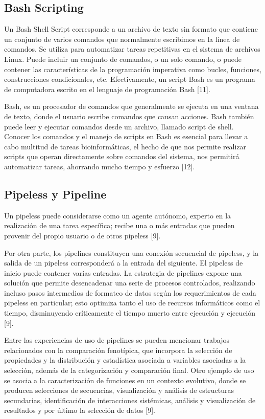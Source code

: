 \documentclass[12pt]{article}
\begin{document}
\subsection*{Bash Scripting}

Un Bash Shell Script corresponde a un archivo de texto sin formato que 
contiene un conjunto de varios comandos que normalmente escribimos en la 
línea de comandos. Se utiliza para automatizar tareas repetitivas en el 
sistema de archivos Linux. Puede incluir un conjunto de comandos, o un solo 
comando, o puede contener las características de la programación imperativa como 
bucles, funciones, construcciones condicionales, etc. Efectivamente, un script 
Bash es un programa de computadora escrito en el lenguaje de programación Bash [11].

Bash, es un procesador de comandos que generalmente se ejecuta en una ventana de 
texto, donde el usuario escribe comandos que causan acciones. Bash también puede 
leer y ejecutar comandos desde un archivo, llamado script de shell.  Conocer los 
comandos y el manejo de scripts en Bash es esencial para llevar a cabo multitud de 
tareas bioinformáticas, el hecho de que nos permite realizar scripts que operan 
directamente sobre comandos del sistema, nos permitirá automatizar tareas, ahorrando 
mucho tiempo y esfuerzo [12].

\subsection*{Pipeless y Pipeline}

Un pipeless puede considerarse como un agente autónomo, experto en la 
realización de una tarea específica; recibe una o más entradas que pueden 
provenir del propio usuario o de otros pipeless [9].

Por otra parte, los pipelines constituyen una conexión secuencial de 
pipeless, y  la salida de un pipeless corresponderá a la entrada del siguiente. 
El pipeless de inicio puede contener varias entradas. La estrategia de pipelines 
expone una solución que permite desencadenar una serie de procesos controlados, 
realizando incluso pasos intermedios de formateo de datos según los requerimientos 
de cada pipeless en particular; esto optimiza tanto el uso de recursos informáticos 
como el tiempo, disminuyendo críticamente el tiempo muerto entre 
ejecución y ejecución [9].

Entre las experiencias de uso de pipelines se pueden mencionar trabajos 
relacionados con la comparación fenotípica, que incorpora la selección de propiedades 
y la distribución y estadística asociada a variables asociadas a la selección, además 
de la categorización y comparación final. Otro ejemplo de uso se asocia a la 
caracterización de funciones en un contexto evolutivo, donde se producen selecciones 
de secuencias, visualización y análisis de estructuras secundarias, identificación 
de interacciones sistémicas, análisis y visualización de resultados y por último la 
selección de datos [9].
\end{document}
